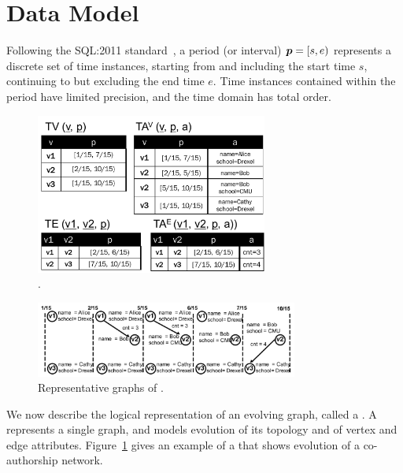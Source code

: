 \section{Data Model}
\label{sec:model}

Following the SQL:2011
standard~\cite{DBLP:journals/sigmod/KulkarniM12}, a period (or
interval) $\boldsymbol{p} = [s, e)$ represents a discrete set of time instances,
  starting from and including the start time $s$, continuing to but
  excluding the end time $e$.  Time instances contained within the
  period have limited precision, and the time domain has total order.


\begin{figure}[t!]
\centering
\includegraphics[width=3in]{figs/T1_rel.pdf}
\caption{\tg {}.}
\label{fig:tg_ve}
\end{figure}

\begin{figure}[t!]
\centering
\includegraphics[width=3.4in]{figs/T1_graphs.pdf}
\caption{Representative graphs of \tg {}.}
\label{fig:tg_rg}
\end{figure}

We now describe the logical representation of an evolving graph,
called a \tg.  A \tg represents a single graph, and models evolution
of its topology and of vertex and edge attributes.
Figure~\ref{fig:tg_ve} gives an example of a \tg that shows evolution
of a co-authorship network.


